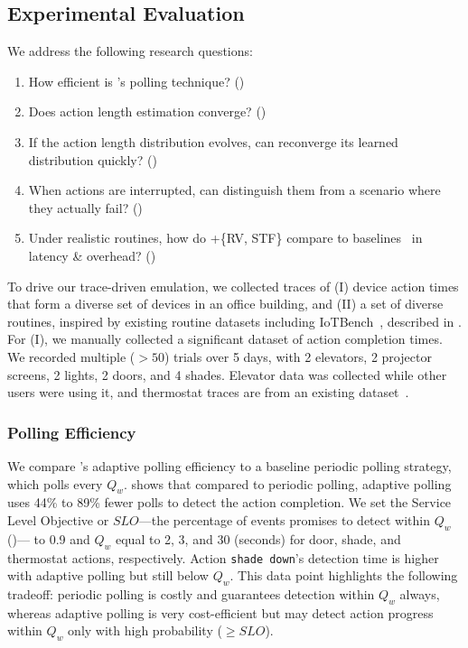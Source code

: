\subsection{Experimental Evaluation}
\label{rasc:sec:eval}

We address the following research questions: 
\begin{enumerate}
    \item How efficient is \sysname's polling technique? ()
    \item Does action length estimation converge? () 
    \item If the action length distribution evolves, can \sysname{} reconverge its learned distribution quickly? ()
    \item When actions are interrupted, can \sysname{} distinguish them from a scenario where they actually fail? ()
    \item Under realistic routines, how do \scheduler+\{RV, STF\} compare to baselines~\cite{SafeHomeEuroSys2021} {in latency \& overhead}? ()
\end{enumerate}

To drive our trace-driven emulation, we collected traces of (I) device action times that form a diverse set of devices in an office building, and (II) a set of diverse routines, inspired by existing routine datasets including IoTBench~\cite{iotbench,smartthingsapps}, described in .
For (I), we manually collected a significant dataset of action completion times. We recorded multiple ($>50$) trials over 5 days, with 2 elevators, 2 projector screens, 2 lights, 2 doors, and 4 shades. Elevator data was collected while other users were using it, and thermostat traces are from an existing dataset~\cite{fraunhofer_thermostat_2022}.  

\subsubsection{\sysname{} Polling Efficiency}
\label{rasc:sec:detection_times}

We compare \sysname's adaptive polling efficiency to a baseline periodic polling strategy, which polls every $Q_w$.
 shows that compared to periodic polling, adaptive polling uses 44\% to 89\% fewer polls to detect the action completion. 
We set the Service Level Objective or $SLO$---the percentage of events \sysname{} promises to detect within $Q_w$ ()---%
to 0.9 and $Q_w$ equal to 2, 3, and 30 (seconds) for door, shade, and thermostat actions, respectively.
Action \texttt{shade down}'s detection time is higher with adaptive polling but still below $Q_w$. This data point highlights the following tradeoff: periodic polling is costly and guarantees detection within $Q_w$ always, whereas adaptive polling is very cost-efficient but may detect action progress within $Q_w$ only with high probability ($\ge SLO$).


